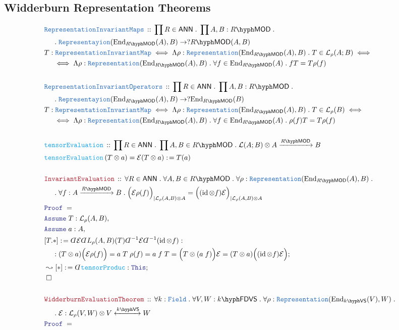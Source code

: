 \documentclass[12pt]{scrartcl}%
\newcommand{\TYPE}[1]{\textcolor{NavyBlue}{\mathtt{#1}}}%
\newcommand{\FUNC}[1]{\textcolor{Cerulean}{\mathtt{#1}}}%
\newcommand{\LOGIC}[1]{\textcolor{Blue}{\mathtt{#1}}}%
\newcommand{\THM}[1]{\textcolor{Maroon}{\mathtt{#1}}}%
\renewcommand{\.}{\; . \;} %
\newcommand{\de}{: \kern 0.1pc =} %
\newcommand{\Act}[1]{\left( #1 \right)} %
\newcommand{\Theorem}[2]{& \THM{#1} \, :: \, #2 \\ & \Proof = \\ } %
\newcommand{\DeclareType}[2]{& \TYPE{#1} \, :: \, #2 \\}%
\newcommand{\DefineNamedType}[4]{& #1 : \TYPE{#2} \iff #3 \iff #4 \\}%
\newcommand{\DeclareFunc}[2]{& \FUNC{#1} \, :: \, #2 \\}%
\newcommand{\DefineNamedFunc}[4]{&  \FUNC{#1}\Act{#2} = #3 \de #4 \\}%
\newcommand{\NewLine}{\\ & \kern 1pc}%
\newcommand{\Page}[1]{ \begin{align*} #1 \end{align*}  }%
\newcommand{ \bd }{ \ByDef }%
\DeclareMathOperator*{\id}{id}%
\newcommand{\End}{\mathrm{End}}%
\newcommand{\Conclude}[3]{& #1 \de #2 : #3; \\}%
\newcommand{\DeriveConclude}[3]{& \leadsto #1 \de #2 : #3 ; \\} %
\newcommand{\Assume}[2]{& \LOGIC{Assume} \; #1 : #2, \\} %
\newcommand{\QED}{\; \square} %
\newcommand{\EndProof}{& \QED \\} %
\newcommand{\ByDef}{\rotatebox[origin=c]{-180}{$D$}}%
\newcommand{\Proof}{\LOGIC{Proof} \; } %
\newcommand{\Arrow}[1]{\xrightarrow{#1}}%
\newcommand{\ToIso}[1]{\xleftrightarrow{#1}}%
\newcommand{\VS}[1]{#1\hyph\mathsf{VS}} %
\newcommand{\FDVS}[1]{#1\hyph\mathsf{FDVS}} %
\newcommand{\LMOD}[1]{#1\hyph\mathsf{MOD}} %
\renewcommand{\L}{\mathcal{L}}
\newcommand{\Field}{\TYPE{Field}}
\newcommand{\ANN}{\mathsf{ANN}} %
\begin{document}
\subsection{Widderburn Representation Theorems}
\Page{
	\DeclareType{RepresentationInvariantMaps}
	{
		\prod R \in \ANN \. 
		\prod A,B : \LMOD{R} \.
		\NewLine \. 
		\TYPE{Representayion}
		(\End_{\LMOD{R}}(A),B)
		\to  ?\LMOD{R}(A,B)
	}
	\DefineNamedType{T}{RepresentationInvariantMap}
	{  
		\Lambda \rho :   
		\TYPE{Representation}(\End_{\LMOD{R}}(A),B) \. 
		T \in \L_\rho(A;B) 
	}
	{  
		\NewLine \iff 
		\Lambda \rho :   
		\TYPE{Representation}(\End_{\LMOD{R}}(A),B) \. 
		\forall f \in \End_{\LMOD{R}}(A) \.
		f T = T\rho(f)
	}
	\\
	\DeclareType{RepresentationInvariantOperators}
	{
		\prod R \in \ANN \. 
		\prod A,B : \LMOD{R} \.
		\NewLine \. 
		\TYPE{Representayion}
		(\End_{\LMOD{R}}(A),B)
		\to  ?\End_{\LMOD{R}}(B)
	}
	\DefineNamedType{T}{RepresentationInvariantMap}
	{  
		\Lambda \rho :   
		\TYPE{Representation}(\End_{\LMOD{R}}(A),B) \. 
		T \in \L_\rho(B) 
	}
	{  
		\NewLine \iff 
		\Lambda \rho :   
		\TYPE{Representation}(\End_{\LMOD{R}}(A),B) \. 
		\forall f \in \End_{\LMOD{R}}(A) \.
		\rho(f) T = T\rho(f)
	}
	\\
	\DeclareFunc{tensorEvaluation}
	{
		\prod R \in \ANN \.
		\prod A,B \in \LMOD{R} \.
		\L(A;B) \otimes A \Arrow{\LMOD{R}} B
	}
	\DefineNamedFunc{tensorEvaluation}{T \otimes a}
	{ \mathcal{E}(T \otimes a) }{ T(a)  }
	\\
	\Theorem{InvariantEvaluation}
	{
		\forall R \in \ANN \.
		\forall A,B \in \LMOD{R} \.
		\forall \rho : \TYPE{Representation}(\End_{\LMOD{R}}(A),B) \. 
		\NewLine \.
		\forall f : A \Arrow{\LMOD{R}} B \.
		\Big(\mathcal{E} \rho(f)\Big)_{|\L_\rho(A,B)\otimes A} = 
		\Big((\id \otimes f) \mathcal{E}\Big)_{|\L_\rho(A,B) \otimes A}
	}
	\Assume{T}{\L_\rho(A,B)}
	\Assume{a}{A}
	\Conclude{[T.*]}
	{
		\bd \mathcal{E}
		\bd L_{\rho}(A,B)(T)
		\bd^{-1} \mathcal{E}
		\bd^{-1} (\id \otimes f)
	}
	{
		\NewLine :
		(T \otimes a)
		\Big(\mathcal{E} \rho(f)\Big)  = 
		a \; T \; \rho(f)  =
		a \; f \; T =
		\Big(T \otimes (a \; f) \Big) \mathcal{E} =
		(T \otimes a)\Big((\id \otimes f) \mathcal{E}\Big)
	}
	\DeriveConclude{[*]}
	{
		\bd \FUNC{tensorProduc}
	}
	{
		\LOGIC{This}
	}
	\EndProof
	\\
	\Theorem{WidderburnEvaluationTheorem}
	{
		\forall k : \Field \.
		\forall V,W : \FDVS{k} \.
		\forall \rho : \TYPE{Representation}(\End_{\VS{k}}(V),W) \.
		\NewLine \.
		\mathcal{E} : \L_\rho(V,W) \otimes V \ToIso{\VS{k}} W 
	}
}
\end{document}

